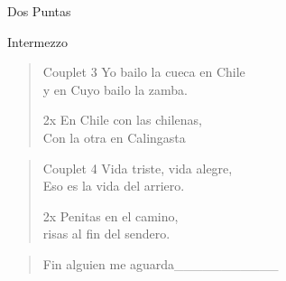 \begin{song}{Dos Puntas}
\begin{instrumental}{Intermezzo}
\measure{}\measure{}\measure{}\measure{}\measure{}
\end{instrumental}

\begin{verse}{Couplet 3}
Yo bailo la cueca en Chile\\
y en Cuyo bailo la zamba.\\
\begin{sidenote}{2x}
En Chile con las chilenas,\\
Con la otra en Calingasta
\end{sidenote}
\end{verse}

\begin{verse}{Couplet 4}
Vida triste, vida alegre,\\
Eso es la vida del arriero.\\
\begin{sidenote}{2x}
Penitas en el camino,\\
risas al fin del sendero.
\end{sidenote}
\end{verse}

\begin{verse}{Fin}
alguien me  aguarda\_\_\_\_\_\_\_\_\_\_\_
\end{verse}
\end{song}


